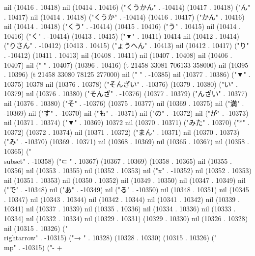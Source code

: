 nil (10416 . 10418) nil (10414 . 10416) ("くうかん" . -10414) (10417 . 10418) ("ん" . 10417) nil (10414 . 10418) ("くうか" . -10414) (10416 . 10417) ("かん" . 10416) nil (10414 . 10418) ("くう" . -10414) (10415 . 10416) ("う" . 10415) nil (10414 . 10416) ("く" . -10414) (10413 . 10415) ("▼" . 10411) 10414 nil (10412 . 10414) ("りさん" . -10412) (10413 . 10415) ("ょうへん" . 10413) nil (10412 . 10417) ("り" . -10412) (10411 . 10413) nil (10408 . 10411) nil (10407 . 10408) nil (10406 . 10407) nil (" " . 10407) (10396 . 10416) (t 21458 33081 706133 358000) nil (10395 . 10396) (t 21458 33080 78125 277000) nil (" " . -10385) nil (10377 . 10386) ("▼" . 10375) 10378 nil (10376 . 10378) ("そんざい" . -10376) (10379 . 10380) ("い" . 10379) nil (10376 . 10380) ("そんざ" . -10376) (10377 . 10379) ("んざい" . 10377) nil (10376 . 10380) ("そ" . -10376) (10375 . 10377) nil (10369 . 10375) nil ("満" . -10369) nil ("す" . -10370) nil ("も" . -10371) nil ("の" . -10372) nil ("が" . -10373) nil (10371 . 10374) ("▼" . 10369) 10372 nil (10370 . 10371) ("みた" . 10370) ("*" . 10372) (10372 . 10374) nil (10371 . 10372) ("まん" . 10371) nil (10370 . 10373) ("み" . -10370) (10369 . 10371) nil (10368 . 10369) nil (10365 . 10367) nil (10358 . 10365) ("\\subset" . -10358) ("⊂
" . 10367) (10367 . 10369) (10358 . 10365) nil (10355 . 10356) nil (10353 . 10355) nil (10352 . 10353) nil ("x" . -10352) nil (10352 . 10353) nil (10351 . 10353) nil (10350 . 10352) nil (10349 . 10350) nil (10347 . 10349) nil ("で" . -10348) nil ("あ" . -10349) nil ("る" . -10350) nil (10348 . 10351) nil (10345 . 10347) nil (10343 . 10344) nil (10342 . 10344) nil (10341 . 10342) nil (10339 . 10341) nil (10337 . 10339) nil (10335 . 10336) nil (10334 . 10336) nil (10333 . 10334) nil (10332 . 10334) nil (10329 . 10331) (10329 . 10330) nil (10326 . 10328) nil (10315 . 10326) ("\\rightarrow" . -10315) ("→
" . 10328) (10328 . 10330) (10315 . 10326) ("\\mp" . -10315) ("-
+
